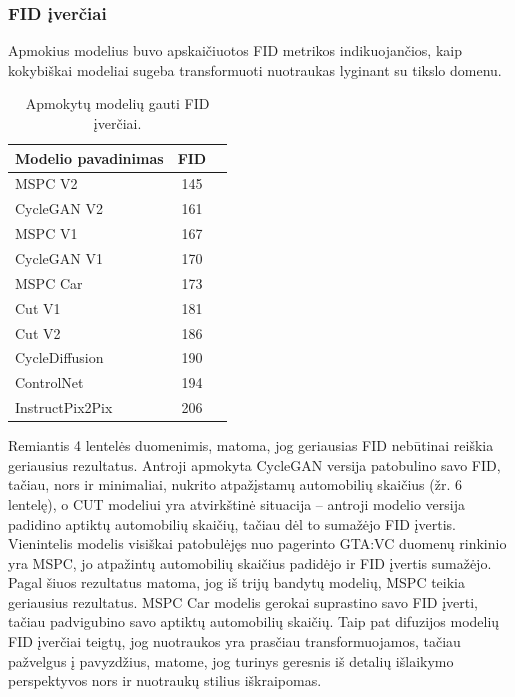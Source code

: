 \documentclass{VUMIFPSbakalaurinis}
\begin{document}
        \subsubsection{FID įverčiai}
            Apmokius modelius buvo apskaičiuotos FID metrikos indikuojančios, kaip kokybiškai modeliai sugeba transformuoti nuotraukas lyginant su tikslo domenu.
            \begin{table}[H]
                \footnotesize
                \centering
                \caption{Apmokytų modelių gauti FID įverčiai.}
                {\begin{tabular}{|l|c|c|} \hline
                    Modelio pavadinimas & FID\\
                    \hline
                    MSPC V2 & 145\\
                    CycleGAN V2 & 161\\
                    MSPC V1 & 167\\
                    CycleGAN V1 & 170\\
                    MSPC Car & 173\\ %
                    Cut V1 & 181\\
                    Cut V2 & 186\\ 
                    CycleDiffusion & 190\\ %
                    ControlNet & 194\\ %
                    InstructPix2Pix & 206\\ %
                    \hline
                    \end{tabular}
                }
                \label{tab:table example}
            \end{table}
    
            Remiantis 4 lentelės duomenimis, matoma, jog geriausias FID nebūtinai reiškia geriausius rezultatus. Antroji apmokyta CycleGAN versija patobulino savo FID, tačiau, nors ir minimaliai, nukrito atpažįstamų automobilių skaičius (žr. 6 lentelę), o CUT modeliui yra atvirkštinė situacija – antroji modelio versija padidino aptiktų automobilių skaičių, tačiau dėl to sumažėjo FID įvertis. Vienintelis modelis visiškai patobulėjęs nuo pagerinto GTA:VC duomenų rinkinio yra MSPC, jo atpažintų automobilių skaičius padidėjo ir FID įvertis sumažėjo. Pagal šiuos rezultatus matoma, jog iš trijų bandytų modelių, MSPC teikia geriausius rezultatus. MSPC Car modelis gerokai suprastino savo FID įverti, tačiau padvigubino savo aptiktų automobilių skaičių. Taip pat difuzijos modelių FID įverčiai teigtų, jog nuotraukos yra prasčiau transformuojamos, tačiau pažvelgus į pavyzdžius, matome, jog turinys geresnis iš detalių išlaikymo perspektyvos nors ir nuotraukų stilius iškraipomas.
\end{document}
